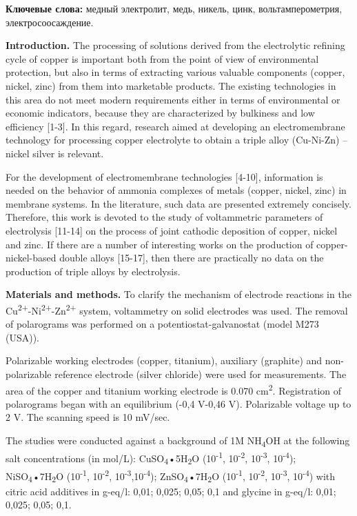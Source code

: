 {\bfseries Ключевые слова:} медный электролит, медь, никель, цинк,
вольтамперометрия, электросоосаждение.

{\bfseries Introduction.} The processing of solutions derived from the
electrolytic refining cycle of copper is important both from the point
of view of environmental protection, but also in terms of extracting
various valuable components (copper, nickel, zinc) from them into
marketable products. The existing technologies in this area do not meet
modern requirements either in terms of environmental or economic
indicators, because they are characterized by bulkiness and low
efficiency {[}1-3{]}. In this regard, research aimed at developing an
electromembrane technology for processing copper electrolyte to obtain a
triple alloy (Cu-Ni-Zn) -- nickel silver is relevant.

For the development of electromembrane technologies {[}4-10{]},
information is needed on the behavior of ammonia complexes of metals
(copper, nickel, zinc) in membrane systems. In the literature, such data
are presented extremely concisely. Therefore, this work is devoted to
the study of voltammetric parameters of electrolysis {[}11-14{]} on the
process of joint cathodic deposition of copper, nickel and zinc. If
there are a number of interesting works on the production of
copper-nickel-based double alloys {[}15-17{]}, then there are
practically no data on the production of triple alloys by electrolysis.

{\bfseries Materials and methods.} To clarify the mechanism of electrode
reactions in the
Cu\textsuperscript{2+}-Ni\textsuperscript{2+}-Zn\textsuperscript{2+}
system, voltammetry on solid electrodes was used. The removal of
polarograms was performed on a potentiostat-galvanostat (model M273
(USA)).

Polarizable working electrodes (copper, titanium), auxiliary (graphite)
and non-polarizable reference electrode (silver chloride) were used for
measurements. The area of the copper and titanium working electrode is
0.070 cm\textsuperscript{2}. Registration of polarograms began with an
equilibrium (-0,4 V-0,46 V). Polarizable voltage up to 2 V. The scanning
speed is 10 mV/sec.

The studies were conducted against a background of 1M
NH\textsubscript{4}OH at the following salt concentrations (in mol/L):
CuSO\textsubscript{4}•5H\textsubscript{2}O (10\textsuperscript{-1},
10\textsuperscript{-2}, 10\textsuperscript{-3}, 10\textsuperscript{-4});
NiSO\textsubscript{4}•7H\textsubscript{2}O (10\textsuperscript{-1},
10\textsuperscript{-2}, 10\textsuperscript{-3},10\textsuperscript{-4});
ZnSO\textsubscript{4}•7H\textsubscript{2}O (10\textsuperscript{-1},
10\textsuperscript{-2}, 10\textsuperscript{-3}, 10\textsuperscript{-4})
with citric acid additives in g-eq/l: 0,01; 0,025; 0,05; 0,1 and glycine
in g-eq/l: 0,01; 0,025; 0,05; 0,1.

